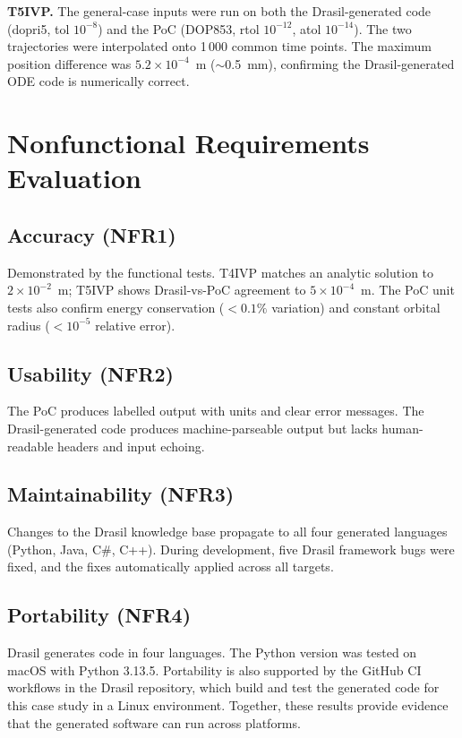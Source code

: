 \documentclass[12pt, titlepage]{article}
\begin{document}
\textbf{T5IVP.}
The general-case inputs were run on both the Drasil-generated code (dopri5,
tol $10^{-8}$) and the PoC (DOP853, rtol $10^{-12}$, atol $10^{-14}$). The
two trajectories were interpolated onto 1\,000 common time points. The maximum
position difference was $5.2\times10^{-4}$~m ($\sim$0.5~mm), confirming the
Drasil-generated ODE code is numerically correct.

\section{Nonfunctional Requirements Evaluation}

\subsection{Accuracy (NFR1)}

Demonstrated by the functional tests. T4IVP matches an analytic solution to
$2\times10^{-2}$~m; T5IVP shows Drasil-vs-PoC agreement to
$5\times10^{-4}$~m. The PoC unit tests also confirm energy conservation
($<0.1\%$ variation) and constant orbital radius ($<10^{-5}$ relative error).

\subsection{Usability (NFR2)}

The PoC produces labelled output with units and clear error messages. The
Drasil-generated code produces machine-parseable output but lacks
human-readable headers and input echoing.

\subsection{Maintainability (NFR3)}

Changes to the Drasil knowledge base propagate to all four generated languages
(Python, Java, C\#, C++). During development, five Drasil framework bugs were
fixed, and the fixes automatically applied across all targets.

\subsection{Portability (NFR4)}

Drasil generates code in four languages. The Python version was tested on macOS
with Python 3.13.5. Portability is also supported by the GitHub CI
workflows in the Drasil repository, which build and test the generated code
for this case study in a Linux environment. Together, these results provide
evidence that the generated software can run across platforms.
\end{document}
